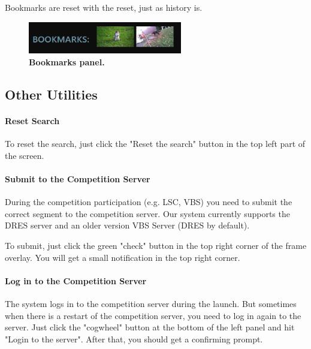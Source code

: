 Bookmarks are reset with the reset, just as history is.

\begin{figure}[h]
	\centering
	\includegraphics[width=0.6\textwidth]{img/bookmarks-panel.png}
  \caption{\textbf{Bookmarks panel.}}
	\label{fig:bookmarks}
\end{figure}

\subsection{Other Utilities}
\paragraph{Reset Search}
\label{par:reset}
To reset the search, just click the "Reset the search" button in the top left part of the screen.

\paragraph{Submit to the Competition Server}
During the competition participation (e.g. LSC, VBS) you need to submit the correct segment to the competition server. Our system currently supports the DRES server and an older version VBS Server (DRES by default). 

To submit, just click the green "check" button in the top right corner of the frame overlay. You will get a small notification in the top right corner.

\paragraph{Log in to the Competition Server}
The system logs in to the competition server during the launch. But sometimes when there is a restart of the competition server, you need to log in again to the server. Just click the "cogwheel" button at the bottom of the left panel and hit "Login to the server". After that, you should get a confirming prompt. 





